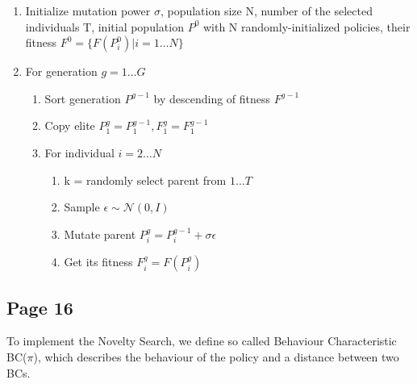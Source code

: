 \begin{enumerate}
\item Initialize mutation power \begin{math}\sigma\end{math}, population size N,
  number of the selected individuals T, initial
  population \begin{math}P^0\end{math} with N randomly-initialized
  policies, their fitness \begin{math}F^0=\{F(P^0_i)|i=1 \ldots N\}\end{math}
\item For generation \begin{math}g = 1 \ldots G\end{math}

  \begin{enumerate}
    \item Sort generation \begin{math}P^{g-1}\end{math} by descending of fitness \begin{math}F^{g-1}\end{math}
    \item Copy elite \begin{math}P^g_1=P^{g-1}_1, F_1^g=F_1^{g-1}\end{math}
    \item For individual \begin{math}i = 2\ldots N\end{math}
      \begin{enumerate}
      \item k = randomly select parent from \begin{math}1\ldots T\end{math}
      \item Sample \begin{math}\epsilon \sim \mathcal{N}(0, I)\end{math}
      \item Mutate parent \begin{math}P_i^g=P_i^{g-1}+\sigma\epsilon\end{math}
      \item Get its fitness \begin{math}F_i^g=F(P_i^g)\end{math}
      \end{enumerate}
  \end{enumerate}
\end{enumerate}

\subsection{Page 16}
To implement the Novelty Search, we define so called Behaviour Characteristic BC(\begin{math}\pi\end{math}),
which describes the behaviour of the policy and a distance between two BCs.


